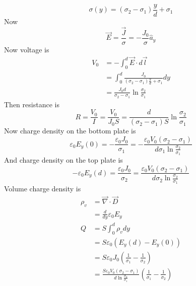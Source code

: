 \documentclass[answers]{exam}
\begin{document}
\begin{questions}
\begin{solution}
    $$\sigma(y) = (\sigma_2-\sigma_1)\frac{y}{d} + \sigma_1$$
    Now
    $$\vec E = \frac{\vec J}{\sigma} = -\frac{J_0}{\sigma}\hat a_y$$
    Now voltage is
    \begin{align*}
        V_0 &= -\int_0^d \vec E \cdot d\vec l \\
            &= \int_0^d \frac{J_0}{(\sigma_2-\sigma_1)\frac{y}{d}+\sigma_1} dy \\
            &= \frac{J_0d}{\sigma_2-\sigma_1} \ln\frac{\sigma_2}{\sigma_1}
    \end{align*}
    Then resistance is
    $$R = \frac{V_0}{I} = \frac{V_0}{J_0S} = \frac{d}{(\sigma_2-\sigma_1)S} \ln\frac{\sigma_2}{\sigma_1}$$
    Now charge density on the bottom plate is
    $$\varepsilon_0E_y(0) = -\frac{\varepsilon_0J_0}{\sigma_1} = -\frac{\varepsilon_0V_0(\sigma_2-\sigma_1)}{d\sigma_1\ln\frac{\sigma_2}{\sigma_1}}$$
    And charge density on the top plate is
    $$-\varepsilon_0E_y(d) = \frac{\varepsilon_0J_0}{\sigma_2} = \frac{\varepsilon_0V_0(\sigma_2-\sigma_1)}{d\sigma_2\ln\frac{\sigma_2}{\sigma_1}}$$
    Volume charge density is
    \begin{align*}
        \rho_v &= \vec\nabla \cdot \vec D \\
               &= \frac{d}{dy} \varepsilon_0E_y \\
        Q &= S\int_0^d \rho_v dy \\
          &= S\varepsilon_0(E_y(d) - E_y(0)) \\
          &= S\varepsilon_0J_0\left(\frac{1}{\sigma_1} - \frac{1}{\sigma_2}\right) \\
          &= \frac{S\varepsilon_0V_0(\sigma_2-\sigma_1)}{d\ln\frac{\sigma_2}{\sigma_1}}\left(\frac{1}{\sigma_1} - \frac{1}{\sigma_2}\right)
    \end{align*}
\end{solution}



\end{questions}
\end{document}
